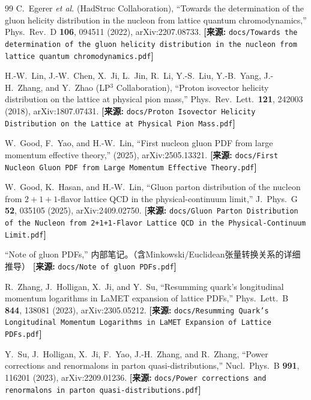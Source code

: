 \documentclass[12pt,a4paper]{ctexart}
\theoremstyle{definition}
\begin{document}
\begin{thebibliography}{99}
C.~Egerer \textit{et al.} (HadStruc Collaboration),
``Towards the determination of the gluon helicity distribution in the nucleon from lattice quantum chromodynamics,''
Phys.\ Rev.\ D \textbf{106}, 094511 (2022), arXiv:2207.08733.
\quad\textbf{[来源:} \texttt{docs/Towards the determination of the gluon helicity distribution in the nucleon from lattice quantum chromodynamics.pdf}\textbf{]}

H.-W.~Lin, J.-W.~Chen, X.~Ji, L.~Jin, R.~Li, Y.-S.~Liu, Y.-B.~Yang, J.-H.~Zhang, and Y.~Zhao (LP$^3$ Collaboration),
``Proton isovector helicity distribution on the lattice at physical pion mass,''
Phys.\ Rev.\ Lett.\ \textbf{121}, 242003 (2018), arXiv:1807.07431.
\quad\textbf{[来源:} \texttt{docs/Proton Isovector Helicity Distribution on the Lattice at Physical Pion Mass.pdf}\textbf{]}

W.~Good, F.~Yao, and H.-W.~Lin,
``First nucleon gluon PDF from large momentum effective theory,''
(2025), arXiv:2505.13321.
\quad\textbf{[来源:} \texttt{docs/First Nucleon Gluon PDF from Large Momentum Effective Theory.pdf}\textbf{]}

W.~Good, K.~Hasan, and H.-W.~Lin,
``Gluon parton distribution of the nucleon from $2+1+1$-flavor lattice QCD in the physical-continuum limit,''
J.\ Phys.\ G \textbf{52}, 035105 (2025), arXiv:2409.02750.
\quad\textbf{[来源:} \texttt{docs/Gluon Parton Distribution of the Nucleon from 2+1+1-Flavor Lattice QCD in the Physical-Continuum Limit.pdf}\textbf{]}

``Note of gluon PDFs,''
内部笔记。（含Minkowski/Euclidean张量转换关系的详细推导）
\quad\textbf{[来源:} \texttt{docs/Note of gluon PDFs.pdf}\textbf{]}


R.~Zhang, J.~Holligan, X.~Ji, and Y.~Su,
``Resumming quark's longitudinal momentum logarithms in LaMET expansion of lattice PDFs,''
Phys.\ Lett.\ B \textbf{844}, 138081 (2023), arXiv:2305.05212.
\quad\textbf{[来源:} \texttt{docs/Resumming Quark's Longitudinal Momentum Logarithms in LaMET Expansion of Lattice PDFs.pdf}\textbf{]}

Y.~Su, J.~Holligan, X.~Ji, F.~Yao, J.-H.~Zhang, and R.~Zhang,
``Power corrections and renormalons in parton quasi-distributions,''
Nucl.\ Phys.\ B \textbf{991}, 116201 (2023), arXiv:2209.01236.
\quad\textbf{[来源:} \texttt{docs/Power corrections and renormalons in parton quasi-distributions.pdf}\textbf{]}


\end{thebibliography}
\end{document}

